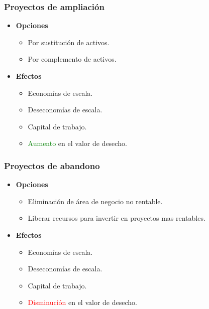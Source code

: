 \documentclass{templateNote}
\begin{document}
\subsubsection{Proyectos de ampliación}

\begin{itemize}
    \item \textbf{Opciones}
    \begin{itemize}
        \item Por sustitución de activos.
        \item Por complemento de activos.
    \end{itemize}
    \item \textbf{Efectos}
    \begin{itemize}
        \item Economías de escala.
        \item Deseconomías de escala.
        \item Capital de trabajo.
        \item \textcolor{green}{Aumento} en el valor de desecho.
    \end{itemize}
\end{itemize}

\subsubsection{Proyectos de abandono}

\begin{itemize}
\item \textbf{Opciones}
    \begin{itemize}
        \item Eliminación de área de negocio no rentable.
        \item Liberar recursos para invertir en proyectos mas rentables.
    \end{itemize}
    \item \textbf{Efectos}
    \begin{itemize}
        \item Economías de escala.
        \item Deseconomías de escala.
        \item Capital de trabajo.
        \item \textcolor{red}{Disminución} en el valor de desecho.
    \end{itemize}
\end{itemize}
\end{document}
